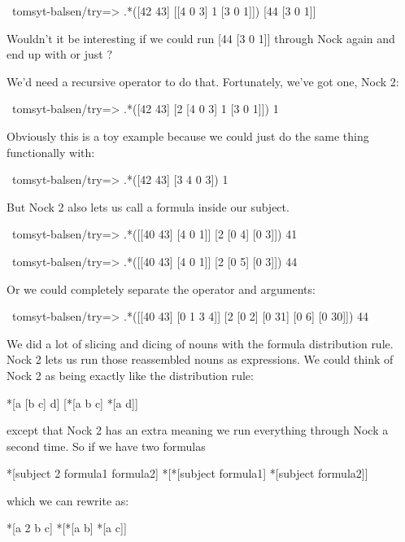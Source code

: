 \begin{code}
~tomsyt-balsen/try=> .*([42 43] [[4 0 3] 1 [3 0 1]])
[44 [3 0 1]]
\end{code}

Wouldn't it be interesting if we could run [44 [3 0 1]] through Nock again and end up with \kode{*[44 [3 0 1]]} or just ?

We'd need a recursive operator to do that. Fortunately, we've got one, Nock 2:

\begin{code}
~tomsyt-balsen/try=> .*([42 43] [2 [4 0 3] 1 [3 0 1]])
1
\end{code}
Obviously this is a toy example because we could just do the same thing
functionally with:

\begin{code}
~tomsyt-balsen/try=> .*([42 43] [3 4 0 3])
1
\end{code}
But Nock 2 also lets us call a formula inside our subject.

\begin{code}
~tomsyt-balsen/try=> .*([[40 43] [4 0 1]] [2 [0 4] [0 3]])
41

~tomsyt-balsen/try=> .*([[40 43] [4 0 1]] [2 [0 5] [0 3]])
44
\end{code}
Or we could completely separate the operator and arguments:

\begin{code}
~tomsyt-balsen/try=> .*([[40 43] [0 1 3 4]] [2 [0 2] [0 31] [0 6] [0 30]])
44
\end{code}
We did a lot of slicing and dicing of nouns with the formula distribution rule.
Nock 2 lets us run those reassembled nouns as expressions. We could think of
Nock 2 as being exactly like the distribution rule:

\begin{code}
*[a [b c] d]          [*[a b c] *[a d]]  
\end{code}
except that Nock 2 has an extra \kode{*} meaning we run everything through Nock a
second time. So if we have two formulas 

\begin{code}
*[subject 2 formula1 formula2]               *[*[subject formula1] *[subject formula2]]  
\end{code}
which we can rewrite as:

\begin{code}
*[a 2 b c]            *[*[a b] *[a c]] 
\end{code}

